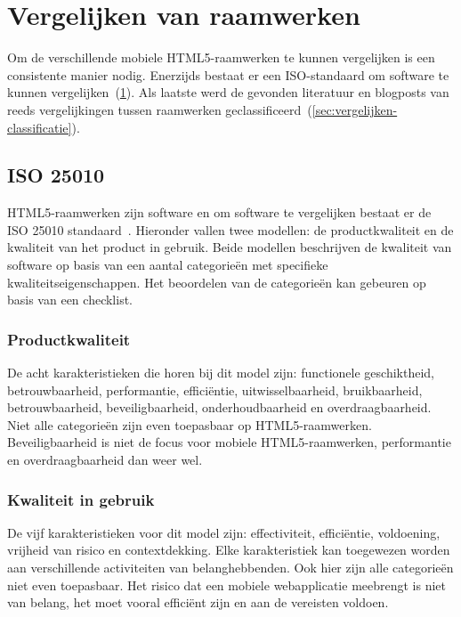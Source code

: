  


\section{Vergelijken van raamwerken} 
\label{sec:vergelijken-raamwerken}
Om de verschillende mobiele HTML5-raamwerken te kunnen vergelijken is een consistente manier nodig.
Enerzijds bestaat er een ISO-standaard om software te kunnen vergelijken~(\ref{sec:vergelijken-raamwerken}).
Als laatste werd de gevonden literatuur en blogposts van reeds vergelijkingen tussen raamwerken geclassificeerd~(\ref{sec:vergelijken-classificatie}).

\subsection{ISO 25010}
\label{sec:vergelijken-iso}

HTML5-raamwerken zijn software en om software te vergelijken bestaat er de ISO 25010 standaard~\cite{Standard2010}.  
Hieronder vallen twee modellen:  de productkwaliteit en de kwaliteit van het product in gebruik.  
Beide modellen beschrijven de kwaliteit van software op basis van een aantal categorieën met specifieke kwaliteitseigenschappen. 
Het beoordelen van de categorieën kan gebeuren op basis van een checklist. 
 
\subsubsection{Productkwaliteit}
De acht karakteristieken die horen bij dit model zijn: functionele geschiktheid,  betrouwbaarheid,  performantie, efficiëntie, uitwisselbaarheid,  bruikbaarheid,  betrouwbaarheid, beveiligbaarheid,  onderhoudbaarheid en overdraagbaarheid.   
Niet alle categorieën zijn even toepasbaar op HTML5-raamwerken.  
Beveiligbaarheid is niet de focus voor mobiele HTML5-raamwerken,  performantie en overdraagbaarheid dan weer wel.

\subsubsection{Kwaliteit in gebruik}
De vijf karakteristieken voor dit model zijn: effectiviteit,  efficiëntie,  voldoening,  vrijheid van risico en contextdekking. 
Elke karakteristiek kan toegewezen worden aan verschillende activiteiten van belanghebbenden. 
Ook hier zijn alle categorieën niet even toepasbaar.  
Het risico dat een mobiele webapplicatie meebrengt is niet van belang,  het moet vooral efficiënt zijn en aan de vereisten voldoen.

